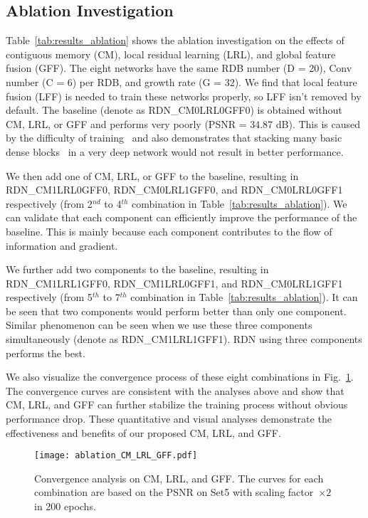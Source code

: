 \documentclass[10pt,twocolumn,letterpaper]{article}
\begin{document}
\subsection{Ablation Investigation}
\label{subsec:ablation}
Table~\ref{tab:results_ablation} shows the ablation investigation on the effects of contiguous memory (CM), local residual learning (LRL), and global feature fusion (GFF). The eight networks have the same RDB number (D = 20), Conv number (C = 6) per RDB, and growth rate (G = 32). We find that local feature fusion (LFF) is needed to train these networks properly, so LFF isn't removed by default. The baseline (denote as RDN\_CM0LRL0GFF0) is obtained without CM, LRL, or GFF and performs very poorly (PSNR = 34.87 dB). This is caused by the difficulty of training~\cite{dong2016image} and also demonstrates that stacking many basic dense blocks~\cite{huang2017densely} in a very deep network would not result in better performance.      

We then add one of CM, LRL, or GFF to the baseline, resulting in RDN\_CM1LRL0GFF0, RDN\_CM0LRL1GFF0, and RDN\_CM0LRL0GFF1 respectively (from 2$^{nd}$ to 4$^{th}$ combination in Table~\ref{tab:results_ablation}). We can validate that each component can efficiently improve the performance of the baseline. This is mainly because each component contributes to the flow of information and gradient. 

We further add two components to the baseline, resulting in RDN\_CM1LRL1GFF0, RDN\_CM1LRL0GFF1, and RDN\_CM0LRL1GFF1 respectively (from 5$^{th}$ to 7$^{th}$ combination in Table~\ref{tab:results_ablation}). It can be seen that two components would perform better than only one component. Similar phenomenon can be seen when we use these three components simultaneously (denote as RDN\_CM1LRL1GFF1). RDN using three components performs the best.

We also visualize the convergence process of these eight combinations in Fig.~\ref{fig:study_CM_LRL_GFF}. The convergence curves are consistent with the analyses above and show that CM, LRL, and GFF can further stabilize the training process without obvious performance drop. These quantitative and visual analyses demonstrate the effectiveness and benefits of our proposed CM, LRL, and GFF.


\begin{figure}[t]
\scriptsize
\centering
\centerline{
\texttt{[image: ablation\_CM\_LRL\_GFF.pdf]}}
\caption{Convergence analysis on CM, LRL, and GFF. The curves for each combination are based on the PSNR on Set5 with scaling factor~$\times2$ in 200 epochs.}  
\label{fig:study_CM_LRL_GFF}
\vspace{-5mm}
\end{figure}
\end{document}
